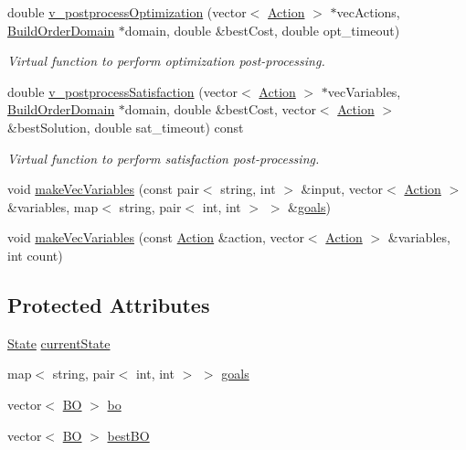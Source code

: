 \begin{DoxyCompactItemize}
double \hyperlink{classghost_1_1BuildOrderObjective_ac08754712162e2d592f102ed68a98e4c}{v\-\_\-postprocess\-Optimization} (vector$<$ \hyperlink{classghost_1_1Action}{Action} $>$ $\ast$vec\-Actions, \hyperlink{classghost_1_1BuildOrderDomain}{Build\-Order\-Domain} $\ast$domain, double \&best\-Cost, double opt\-\_\-timeout)
\begin{DoxyCompactList}\small\item\em Virtual function to perform optimization post-\/processing. \end{DoxyCompactList}\item 
double \hyperlink{classghost_1_1BuildOrderObjective_a9505c468fb79506073b759e0bec156d9}{v\-\_\-postprocess\-Satisfaction} (vector$<$ \hyperlink{classghost_1_1Action}{Action} $>$ $\ast$vec\-Variables, \hyperlink{classghost_1_1BuildOrderDomain}{Build\-Order\-Domain} $\ast$domain, double \&best\-Cost, vector$<$ \hyperlink{classghost_1_1Action}{Action} $>$ \&best\-Solution, double sat\-\_\-timeout) const 
\begin{DoxyCompactList}\small\item\em Virtual function to perform satisfaction post-\/processing. \end{DoxyCompactList}\item 
void \hyperlink{classghost_1_1BuildOrderObjective_a8f898f213a9fa0b59bd0567fa4617b08}{make\-Vec\-Variables} (const pair$<$ string, int $>$ \&input, vector$<$ \hyperlink{classghost_1_1Action}{Action} $>$ \&variables, map$<$ string, pair$<$ int, int $>$ $>$ \&\hyperlink{classghost_1_1BuildOrderObjective_a714a7fc416d8925bc7d2b9026e9a212c}{goals})
\item 
void \hyperlink{classghost_1_1BuildOrderObjective_ae6bd3128472d66100c1643bbaf095017}{make\-Vec\-Variables} (const \hyperlink{classghost_1_1Action}{Action} \&action, vector$<$ \hyperlink{classghost_1_1Action}{Action} $>$ \&variables, int count)
\end{DoxyCompactItemize}
\subsection*{Protected Attributes}
\begin{DoxyCompactItemize}
\item 
\hyperlink{structghost_1_1BuildOrderObjective_1_1State}{State} \hyperlink{classghost_1_1BuildOrderObjective_acb4b4b2c9dc0e99ab98e61289c62aff8}{current\-State}
\item 
map$<$ string, pair$<$ int, int $>$ $>$ \hyperlink{classghost_1_1BuildOrderObjective_a714a7fc416d8925bc7d2b9026e9a212c}{goals}
\item 
vector$<$ \hyperlink{structghost_1_1BuildOrderObjective_1_1BO}{B\-O} $>$ \hyperlink{classghost_1_1BuildOrderObjective_aa55dce8a8fbdc5fe64ddadfa715e968e}{bo}
\item 
vector$<$ \hyperlink{structghost_1_1BuildOrderObjective_1_1BO}{B\-O} $>$ \hyperlink{classghost_1_1BuildOrderObjective_a71ec5c0a8425d3e5facebb76190adfb7}{best\-B\-O}
\end{DoxyCompactItemize}
